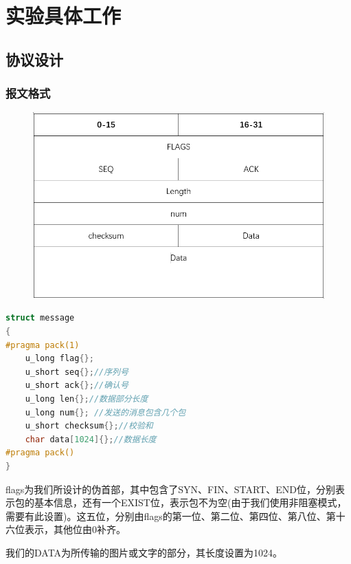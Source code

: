 \documentclass[UTF8,a4paper,10pt]{ctexart}
\begin{document}
\section{实验具体工作}
\subsection{协议设计}
\subsubsection{报文格式}
\begin{figure}[H]
    \centering
    \includegraphics[scale=0.6]{计网1.png}
    \label{fig:1}
\end{figure}
\begin{lstlisting}[title=报文格式,frame=trbl,language={C++}]
struct message
{
#pragma pack(1)
    u_long flag{};
    u_short seq{};//序列号
    u_short ack{};//确认号
    u_long len{};//数据部分长度
    u_long num{}; //发送的消息包含几个包
    u_short checksum{};//校验和
    char data[1024]{};//数据长度
#pragma pack()
}
\end{lstlisting}
flags为我们所设计的伪首部，其中包含了SYN、FIN、START、END位，分别表示包的基本信息，还有一个EXIST位，表示包不为空(由于我们使用非阻塞模式，需要有此设置)。这五位，分别由flags的第一位、第二位、第四位、第八位、第十六位表示，其他位由0补齐。\par
我们的DATA为所传输的图片或文字的部分，其长度设置为1024。
\end{document}
